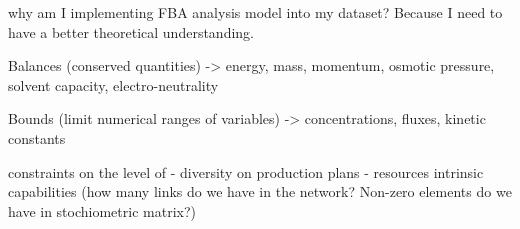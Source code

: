 why am I implementing FBA analysis model into my dataset?
Because I need to have a better theoretical understanding.

Balances (conserved quantities) -> energy, mass, momentum, osmotic pressure, solvent capacity, electro-neutrality

Bounds (limit numerical ranges of variables) -> concentrations, fluxes, kinetic constants

constraints on the level of - diversity on production plans
							- resources
							intrinsic capabilities (how many links do we have in the network? Non-zero elements do we have in stochiometric matrix?)